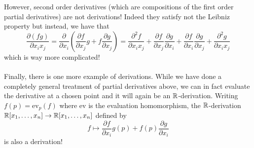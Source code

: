\documentclass[a4paper]{article}
\begin{document}
However, second order derivatives (which are compositions of the first order partial derivatives) are not derivations! Indeed they satisfy not the Leibniz property but instead, we have that $$\frac{\partial (fg)}{\partial x_ix_j}=\frac{\partial}{\partial x_i}\left(\frac{\partial f}{\partial x_j}g+f\frac{\partial g}{\partial x_j}\right)=\frac{\partial^2 f}{\partial x_ix_j}+\frac{\partial f}{\partial x_j}\frac{\partial g}{\partial x_i}+\frac{\partial f}{\partial x_i}\frac{\partial g}{\partial x_j}+\frac{\partial^2g}{\partial x_ix_j}$$ which is way more complicated! \\~\\

Finally, there is one more example of derivations. While we have done a completely general treatment of partial derivatives above, we can in fact evaluate the derivative at a chosen point and it will again be an $\mathbb{R}$-derivation. Writing $f(p)=\text{ev}_p(f)$ where $\text{ev}$ is the evaluation homomorphism, the $\mathbb{R}$-derivation $\mathbb{R}[x_1,\dots,x_n]\to\mathbb{R}[x_1,\dots,x_n]$ defined by $$f\mapsto \frac{\partial f}{\partial x_i}g(p)+f(p)\frac{\partial g}{\partial x_i}$$ is also a derivation! 
\end{document}
